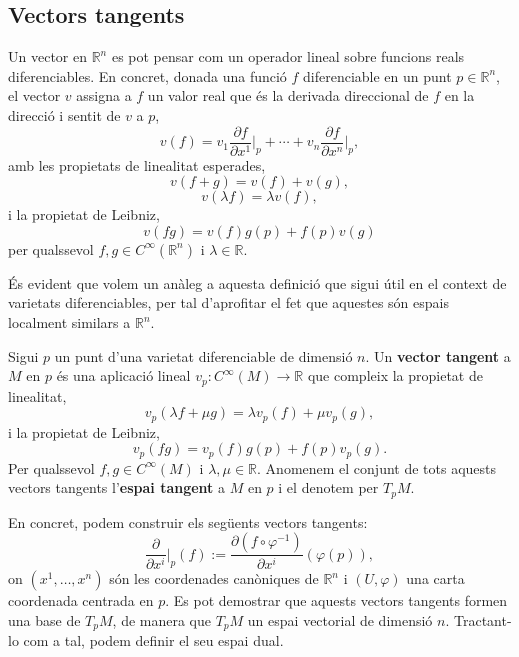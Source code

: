 \subsection{Vectors tangents}
Un vector en $\mathbb R^n$ es pot pensar com un operador lineal sobre funcions reals diferenciables. En concret, donada una funció $f$ diferenciable en un punt $p\in\mathbb R^n$, el vector $v$ assigna a $f$ un valor real que és la derivada direccional de $f$ en la direcció i sentit de $v$ a $p$,
\begin{equation*}
    v(f) = v_1\frac{\partial f}{\partial x^1}\Big|_p + \cdots + v_n\frac{\partial f}{\partial x^n}\Big|_p,
\end{equation*}
amb les propietats de linealitat esperades,
\begin{equation*}
    v(f+g) = v(f) + v(g), 
\end{equation*}
\begin{equation*}
    v(\lambda f) = \lambda v(f),
\end{equation*}
i la propietat de Leibniz,
\begin{equation*}
    v(fg) = v(f)g(p) + f(p)v(g)
\end{equation*}
per qualssevol $f,g\in C^\infty(\mathbb R^n)$ i $\lambda\in\mathbb R$.

És evident que volem un anàleg a aquesta definició que sigui útil en el context de varietats diferenciables, per tal d'aprofitar el fet que aquestes són espais localment similars a $\mathbb R^n$. 

\begin{defi}
    Sigui $p$ un punt d'una varietat diferenciable de dimensió $n$. Un \textbf{vector tangent} a $M$ en $p$ és una aplicació lineal $v_p:C^\infty(M)\to\mathbb R$ que compleix la propietat de linealitat,
    \begin{equation*}
        v_p(\lambda f+\mu g) = \lambda v_p(f) + \mu v_p(g), 
    \end{equation*}
    i la propietat de Leibniz,
    \begin{equation*}
        v_p(fg) = v_p(f)g(p) + f(p)v_p(g).
    \end{equation*}
    Per qualssevol $f,g\in C^\infty(M)$ i $\lambda,\mu\in\mathbb R$.
    Anomenem el conjunt de tots aquests vectors tangents l'\textbf{espai tangent} a $M$ en $p$ i el denotem per $T_pM$.
\end{defi}

En concret, podem construir els següents vectors tangents:
\begin{equation*}
    \frac{\partial}{\partial x^i}\Big|_p(f) := \frac{\partial(f\circ\varphi^{-1})}{\partial x^i}(\varphi(p)),
\end{equation*}
on $(x^1,\dots,x^n)$ són les coordenades canòniques de $\mathbb R^n$ i $(U,\varphi)$ una carta coordenada centrada en $p$. Es pot demostrar que aquests vectors tangents formen una base de $T_pM$, de manera que $T_pM$ un espai vectorial de dimensió $n$. Tractant-lo com a tal, podem definir el seu espai dual.

